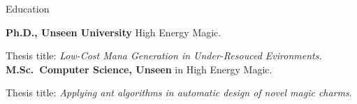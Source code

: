 \begin{rubric}{Education}

\entry*[2009 -- 2013]%
	\textbf{Ph.D., Unseen University} High Energy Magic.
	\par Thesis title: \emph{Low-Cost Mana Generation in Under-Resouced Evironments.}
%
\entry*[2003 -- 2006]%
	\textbf{M.Sc.~Computer Science, Unseen} in High Energy Magic.\par
	Thesis title: \emph{Applying ant algorithms in automatic design of novel magic charms}.
\end{rubric}
